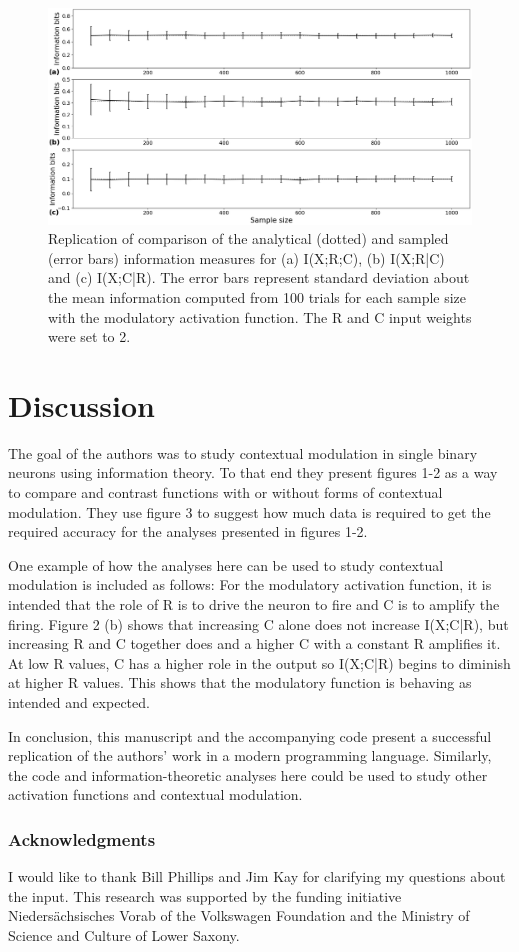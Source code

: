 \begin{figure}[H]
    \includegraphics[width=\textwidth]{figure_3.png}
      \caption{Replication of comparison of the analytical (dotted) and sampled (error bars) information measures for (a) I(X;R;C), (b) I(X;R|C) and (c) I(X;C|R). The error bars represent standard deviation about the mean information computed from 100 trials for each sample size with the modulatory activation function. The R and C input weights were set to 2.}
\end{figure}

\section{Discussion}

The goal of the authors was to study contextual modulation in single binary neurons using information theory. To that end they present figures 1-2 as a way to compare and contrast functions with or without forms of contextual modulation. They use figure 3 to suggest how much data is required to get the required accuracy for the analyses presented in figures 1-2. \newline

One example of how the analyses here can be used to study contextual modulation is included as follows: For the modulatory activation function, it is intended that the role of R is to drive the neuron to fire and C is to amplify the firing. Figure 2 (b) shows that increasing C alone does not increase I(X;C|R), but increasing R and C together does and a higher C with a constant R amplifies it. At low R values, C has a higher role in the output so I(X;C|R) begins to diminish at higher R values. This shows that the modulatory function is behaving as intended and expected. \newline

In conclusion, this manuscript and the accompanying code present a successful replication of the authors' work in a modern programming language. Similarly, the code and information-theoretic analyses here could be used to study other activation functions and contextual modulation.

\subsubsection{Acknowledgments}

I would like to thank Bill Phillips and Jim Kay for clarifying my questions about the input. This research was supported by the funding initiative Niedersächsisches Vorab of the Volkswagen Foundation and the Ministry of Science and Culture of Lower Saxony.
